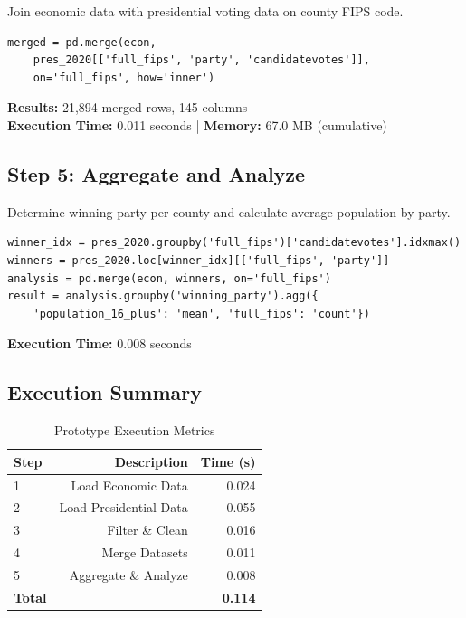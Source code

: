 \documentclass[9pt,a4paper,onecolumn,twoside]{tau-class/tau}
\begin{document}
Join economic data with presidential voting data on county FIPS code.

\begin{lstlisting}
merged = pd.merge(econ, 
    pres_2020[['full_fips', 'party', 'candidatevotes']], 
    on='full_fips', how='inner')
\end{lstlisting}

\textbf{Results:} 21,894 merged rows, 145 columns\\
\textbf{Execution Time:} 0.011 seconds | \textbf{Memory:} 67.0 MB (cumulative)

\subsection{Step 5: Aggregate and Analyze}

Determine winning party per county and calculate average population by party.

\begin{lstlisting}
winner_idx = pres_2020.groupby('full_fips')['candidatevotes'].idxmax()
winners = pres_2020.loc[winner_idx][['full_fips', 'party']]
analysis = pd.merge(econ, winners, on='full_fips')
result = analysis.groupby('winning_party').agg({
    'population_16_plus': 'mean', 'full_fips': 'count'})
\end{lstlisting}

\textbf{Execution Time:} 0.008 seconds

\subsection{Execution Summary}

\begin{table}[htbp]
\centering
\caption{Prototype Execution Metrics}
\label{tab:execution}
\begin{tabular}{lrr}
\hline
Step & Description & Time (s) \\
\hline
1 & Load Economic Data & 0.024 \\
2 & Load Presidential Data & 0.055 \\
3 & Filter \& Clean & 0.016 \\
4 & Merge Datasets & 0.011 \\
5 & Aggregate \& Analyze & 0.008 \\
\hline
\textbf{Total} & & \textbf{0.114} \\
\hline
\end{tabular}
\end{table}
\end{document}
